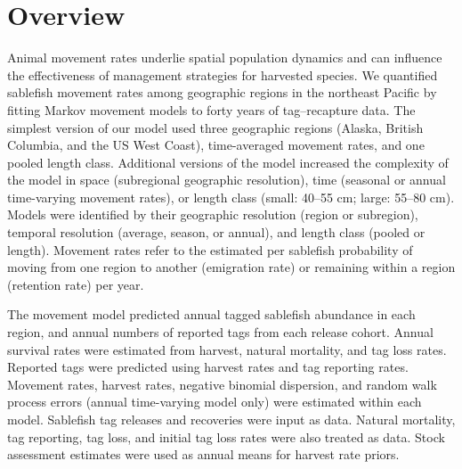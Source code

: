 \documentclass{article}
\begin{document}
\section{Overview}
Animal movement rates underlie spatial population dynamics and can influence the effectiveness of management strategies for harvested species. We quantified sablefish movement rates among geographic regions in the northeast Pacific by fitting Markov movement models to forty years of tag--recapture data. The simplest version of our model used three geographic regions (Alaska, British Columbia, and the US West Coast), time-averaged movement rates, and one pooled length class. Additional versions of the model increased the complexity of the model in space (subregional geographic resolution), time (seasonal or annual time-varying movement rates), or length class (small: 40--55 cm; large: 55--80 cm). Models were identified by their geographic resolution (region or subregion), temporal resolution (average, season, or annual), and length class (pooled or length). Movement rates refer to the estimated per sablefish probability of moving from one region to another (emigration rate) or remaining within a region (retention rate) per year.

The movement model predicted annual tagged sablefish abundance in each region, and annual numbers of reported tags from each release cohort. Annual survival rates were estimated from harvest, natural mortality, and tag loss rates. Reported tags were predicted using harvest rates and tag reporting rates. Movement rates, harvest rates, negative binomial dispersion, and random walk process errors (annual time-varying model only) were estimated within each model. Sablefish tag releases and recoveries were input as data. Natural mortality, tag reporting, tag loss, and initial tag loss rates were also treated as data. Stock assessment estimates were used as annual means for harvest rate priors.
\end{document}
